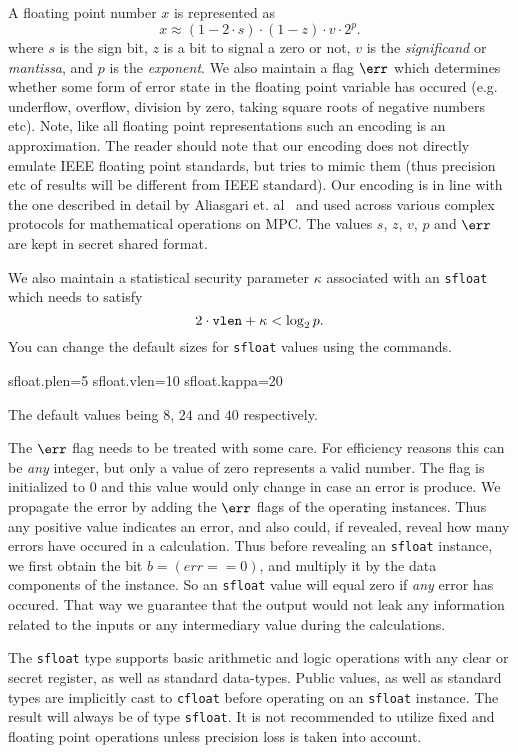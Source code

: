 \noindent
A floating point number $x$ is represented as 
\[
			x\approx (1-2 \cdot s)\cdot (1-z)\cdot v\cdot 2^{p}.
\]
where $s$ is the sign bit,
$z$ is a bit to signal a zero or not,
$v$ is the \textit{significand} or \textit{mantissa},
and $p$ is the \textit{exponent}.
We also maintain a flag $\err$ which determines whether
some form of error state in the floating point variable
has occured (e.g. underflow, overflow, division by zero, taking
square roots of negative numbers etc).
Note, like all floating point representations such an encoding is 
an approximation.
The reader should note that our encoding does not directly
emulate IEEE floating point standards, but tries to mimic them
(thus precision etc of results will be different from IEEE
standard).
Our encoding is in line with the one described in detail 
by Aliasgari et. al~\cite{ABZS13} and used across various 
complex protocols for mathematical operations on MPC.
The values $s$, $z$, $v$, $p$ and $\err$ are kept in
secret shared format.

We also maintain a statistical security parameter $\kappa$ 
associated with an \verb+sfloat+ which needs
to satisfy
\[ 2 \cdot \verb+vlen+  + \kappa < \log_2 p. \]
You can change the default sizes for \verb|sfloat| values using the commands.
\begin{mylisting}
    sfloat.plen=5 
    sfloat.vlen=10
    sfloat.kappa=20
\end{mylisting}
The default values being $8$, $24$ and $40$ respectively.

The $\err$ flag needs to be treated with some care.
For efficiency reasons this can be {\em any} integer, but only
a value of zero represents a valid number.
The flag is initialized to $0$ and this value would only change in case an error is produce. 
We propagate the error by adding the $\err$ flags of the operating instances.
Thus any positive value indicates an error, and also could, if revealed, reveal how
many errors have occured in a calculation.
Thus before revealing an \verb|sfloat| instance, we first obtain the bit $ b = (err == 0)$, 
and multiply it by the data components of the instance. So an \verb|sfloat| value
will equal zero if {\em any} error has occured.
That way we guarantee that the output would not leak any information 
related to the inputs or any intermediary value during the calculations. 

The \verb|sfloat| type supports basic arithmetic and logic operations with 
any clear or secret register, as well as standard data-types. 
Public values, as well as standard types are implicitly cast to \verb|cfloat| 
before operating on an \verb|sfloat| instance. The result will always be of type \verb|sfloat|. 
It is not recommended to utilize fixed and floating point operations unless
precision loss is taken into account.
 
